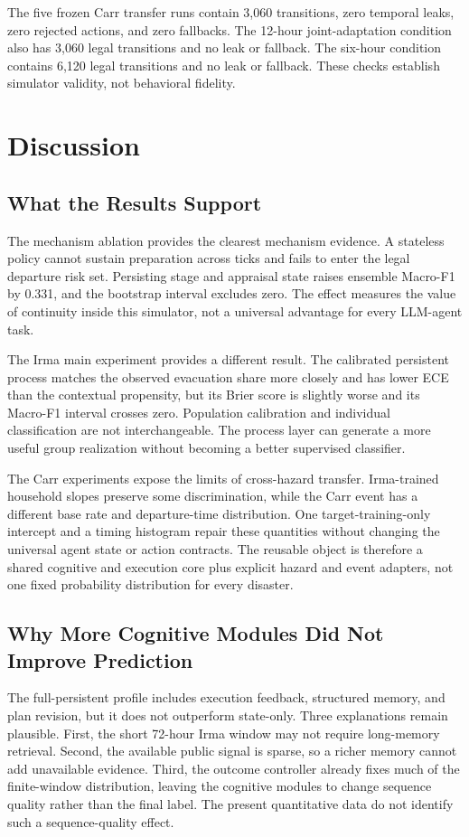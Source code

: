 \documentclass[journal]{IEEEtran}
\begin{document}
The five frozen Carr transfer runs contain 3,060 transitions, zero temporal
leaks, zero rejected actions, and zero fallbacks. The 12-hour joint-adaptation
condition also has 3,060 legal transitions and no leak or fallback. The
six-hour condition contains 6,120 legal transitions and
no leak or fallback. These checks establish simulator validity, not behavioral
fidelity.

\section{Discussion}
\subsection{What the Results Support}
The mechanism ablation provides the clearest mechanism evidence. A stateless
policy
cannot sustain preparation across ticks and fails to enter the legal departure
risk set. Persisting stage and appraisal state raises ensemble Macro-F1 by
0.331, and the bootstrap interval excludes zero. The effect measures the value
of continuity inside this simulator, not a universal advantage for every
LLM-agent task.

The Irma main experiment provides a different result. The calibrated persistent
process matches the observed evacuation share more closely and has lower ECE
than the contextual propensity, but its Brier score is slightly worse and its
Macro-F1 interval crosses zero. Population calibration and individual
classification are not interchangeable. The process layer can generate a more
useful group realization without becoming a better supervised classifier.

The Carr experiments expose the limits of cross-hazard transfer. Irma-trained
household slopes preserve some discrimination, while the Carr event has a
different base rate and departure-time distribution. One target-training-only
intercept and a timing histogram repair these quantities without changing the
universal agent state or action contracts. The reusable object is therefore a
shared cognitive and execution core plus explicit hazard and event adapters,
not one fixed probability distribution for every disaster.

\subsection{Why More Cognitive Modules Did Not Improve Prediction}
The full-persistent profile includes execution feedback, structured memory,
and plan revision, but it does not outperform state-only. Three explanations
remain plausible. First, the short 72-hour Irma window may not require
long-memory retrieval. Second, the available public signal is sparse, so a
richer memory cannot add unavailable evidence. Third, the outcome controller
already fixes much of the finite-window distribution, leaving the cognitive
modules to change sequence quality rather than the final label. The present
quantitative data do not identify such a sequence-quality effect.
\end{document}
